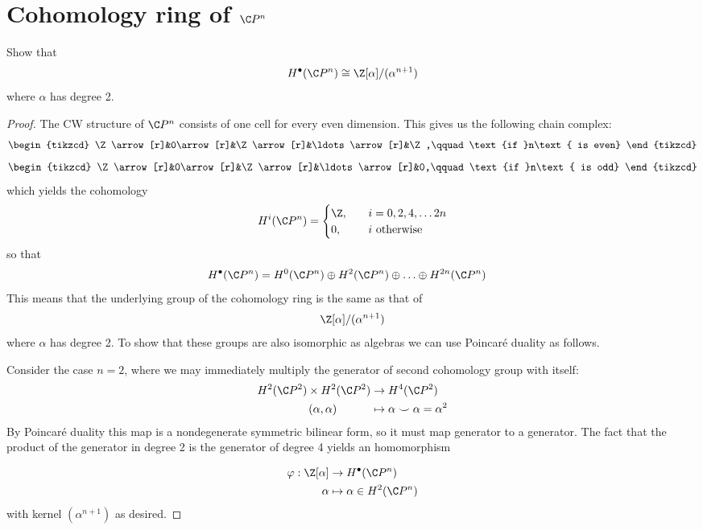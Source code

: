 \section{Cohomology ring of $\C P^n$}
	\begin{exercise}
	Show that
	\[H^\bullet(\C P^n)\cong \Z[\alpha]/(\alpha^{n+1})\]
	where $\alpha$ has degree 2.
\end{exercise}
\begin{proof}
	The CW structure of $\C P^n$ consists of one cell for every even dimension. This gives us the following chain complex:
	\[\begin{tikzcd}
		\Z\arrow[r]&0\arrow[r]&\Z\arrow[r]&\ldots\arrow[r]&\Z,\qquad\text{if }n\text{ is even}
	\end{tikzcd}\]
	\[\begin{tikzcd}
		\Z\arrow[r]&0\arrow[r]&\Z\arrow[r]&\ldots\arrow[r]&0,\qquad\text{if }n\text{ is odd}
	\end{tikzcd}\]
	which yields the cohomology
	\[H^i(\C P^n)=\begin{cases}
		\Z,\quad&i=0,2,4,\ldots 2n\\
		0,\quad&i\text{ otherwise}
	\end{cases}\]
	so that
	\begin{align*}
		H^\bullet(\C P^n)&=H^0(\C P^n)\oplus H^2(\C P^n)\oplus\ldots\oplus H^{2n}(\C P^{n})
	\end{align*}
	This means that the underlying group of the cohomology ring is the same as that of
	\[\Z[\alpha]/(\alpha^{n+1})\]
	where $\alpha$ has degree 2. To show that these groups are also isomorphic as algebras we can use Poincar\'e duality as follows.
	
	Consider the case $n=2$, where we may immediately multiply the generator of second cohomology group with itself:
	\begin{align*}
		H^2(\C P^2)\times H^2(\C P^2)&\to H^4(\C P^2)\\
		(\alpha,\alpha)\qquad\quad&\mapsto\alpha\smile\alpha =\alpha^2
	\end{align*}
	By Poincar\'e duality this map is a nondegenerate symmetric bilinear form, so it must map generator to a generator. {\color{blue-violet}The fact that the product of the generator in degree 2 is the generator of degree 4} yields an homomorphism
	\iffalse\begin{align*}
		\varphi:H^\bullet(\C P^n)&\to\Z[\alpha]/(\alpha^{n+1})\\
		H^2(\C P^n)\ni\alpha&\mapsto\alpha
	\end{align*}
	satisfying
	\[\varphi(\alpha\smile\alpha)=\varphi()\]\fi
	\begin{align*}
		\varphi:\Z[\alpha]&\to H^\bullet(\C P^n)\\
		\alpha&\mapsto\alpha\in H^2(\C P^n)
	\end{align*}
	with kernel $(\alpha^{n+1})$ as desired.
	

\end{proof}
